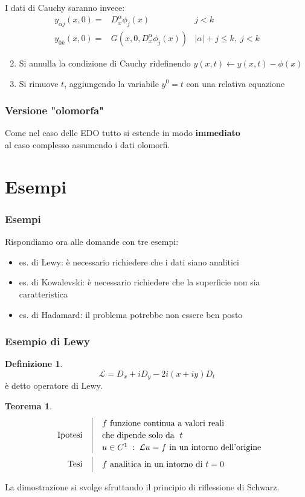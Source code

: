 \documentclass[serif,notheorems]{beamer}
\makeatletter
\newenvironment{ipotesi}%
{\quad\left|\quad\def\arraystretch{1.2}\begin{array}{@{}l@{}}}%
{\end{array}\right.}
\newcommand{\hpth}[2]
{
\begin{align*}
\quad
\text{Ipotesi}
&\begin{ipotesi}
#1
\end{ipotesi}\\
\text{Tesi}
&\begin{ipotesi}
#2
\end{ipotesi}
\end{align*}
}
\theoremstyle{definition} %
\newtheorem{theorem}{Teorema}[section] %
\newtheorem{definition}{Definizione}[section] %
\theoremstyle{remark}
\makeatother
\begin{document}
\begin{frame}
I dati di Cauchy saranno invece:
\begin{align*}
y_{\alpha j}(x, 0) = & D_x^{\alpha} \phi_j(x) & j < k\\
y_{0k}(x, 0) = & G\left( x, 0, D_x^{\alpha} \phi_j(x) \right) & \lvert \alpha \rvert + j \leq k, \; j < k
\end{align*}
\begin{enumerate}
\setcounter{enumi}{1}
\item Si annulla la condizione di Cauchy ridefinendo $y(x,t)\leftarrow y(x,t)-\phi (x)$
\item Si rimuove $t$, aggiungendo la variabile $y^0=t$ con una relativa equazione
\end{enumerate}
\end{frame}

\begin{frame}
\frametitle{Versione "olomorfa"}
\begin{center}
Come nel caso delle EDO tutto si estende in modo \textbf{immediato} \\
al caso complesso assumendo i dati olomorfi.
\end{center}
\end{frame}

\section{Esempi}

\begin{frame}
\frametitle{Esempi}
Rispondiamo ora alle domande con tre esempi:
\begin{itemize}
\item es. di Lewy: è necessario richiedere che i dati siano analitici
\item es. di Kowalevski: è necessario richiedere che la superficie non sia caratteristica
\item es. di Hadamard: il problema potrebbe non essere ben posto
\end{itemize}
\end{frame}

\begin{frame}
\frametitle{Esempio di Lewy}
\begin{definition}
$$\mathcal{L}=D_x+iD_y-2i(x+iy)D_t$$
è detto operatore di Lewy.
\end{definition}
\end{frame}

\begin{frame}
\begin{theorem}
\hpth{
f \text{ funzione continua a valori reali}\\ 
\text{che dipende solo da } \; t\\
u\in C^1\;:\;\mathcal{L}u=f \text{ in un intorno dell'origine }
}
{f \text{ analitica in un intorno di } t=0}
\end{theorem}
La dimostrazione si svolge sfruttando il principio di riflessione di Schwarz.
\end{frame}
\end{document}
